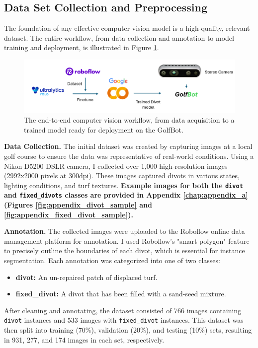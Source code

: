 \subsection{Data Set Collection and Preprocessing}
\label{ssec:cv_dataset}
The foundation of any effective computer vision model is a high-quality, relevant dataset. The entire workflow, from data collection and annotation to model training and deployment, is illustrated in Figure \ref{fig:cv_workflow}.

\begin{figure}[h!]
    \centering
    \includegraphics[width=\linewidth]{figures/datasetworkflow.png}
    \caption{The end-to-end computer vision workflow, from data acquisition to a trained model ready for deployment on the GolfBot.}
    \label{fig:cv_workflow}
\end{figure}

\textbf{Data Collection.}
The initial dataset was created by capturing images at a local golf course to ensure the data was representative of real-world conditions. Using a Nikon D5200 DSLR camera, I collected over 1,000 high-resolution images (2992x2000 pixels at 300dpi). These images captured divots in various states, lighting conditions, and turf textures. \textbf{Example images for both the \texttt{divot} and \texttt{fixed\_divots} classes are provided in Appendix \ref{chap:appendix_a} (Figures \ref{fig:appendix_divot_sample} and \ref{fig:appendix_fixed_divot_sample}).}

\textbf{Annotation.}
The collected images were uploaded to the Roboflow online data management platform for annotation. I used Roboflow's "smart polygon" feature to precisely outline the boundaries of each divot, which is essential for instance segmentation. Each annotation was categorized into one of two classes:
\begin{itemize}
    \item \textbf{divot:} An un-repaired patch of displaced turf.
    \item \textbf{fixed\_divot:} A divot that has been filled with a sand-seed mixture.
\end{itemize}
After cleaning and annotating, the dataset consisted of 766 images containing \texttt{divot} instances and 533 images with \texttt{fixed\_divot} instances. This dataset was then split into training (70\%), validation (20\%), and testing (10\%) sets, resulting in 931, 277, and 174 images in each set, respectively.

